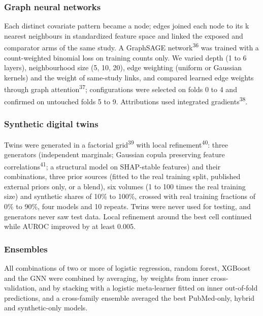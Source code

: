 \documentclass[
  11pt,
]{article}
\begin{document}
\subsubsection{Graph neural networks}\label{graph-neural-networks}

Each distinct covariate pattern became a node; edges joined each node to
its k nearest neighbours in standardized feature space and linked the
exposed and comparator arms of the same study. A GraphSAGE
network\textsuperscript{36} was trained with a count-weighted binomial
loss on training counts only. We varied depth (1 to 6 layers),
neighbourhood size (5, 10, 20), edge weighting (uniform or Gaussian
kernels) and the weight of same-study links, and compared learned edge
weights through graph attention\textsuperscript{37}; configurations were
selected on folds 0 to 4 and confirmed on untouched folds 5 to 9.
Attributions used integrated gradients\textsuperscript{38}.

\subsubsection{Synthetic digital twins}\label{synthetic-digital-twins}

Twins were generated in a factorial grid\textsuperscript{39} with local
refinement\textsuperscript{40}: three generators (independent marginals;
Gaussian copula preserving feature correlations\textsuperscript{41}; a
structural model on SHAP-stable features) and their combinations, three
prior sources (fitted to the real training split, published external
priors only, or a blend), six volumes (1 to 100 times the real training
size) and synthetic shares of 10\% to 100\%, crossed with real training
fractions of 0\% to 90\%, four models and 10 repeats. Twins were never
used for testing, and generators never saw test data. Local refinement
around the best cell continued while AUROC improved by at least 0.005.

\subsubsection{Ensembles}\label{ensembles}

All combinations of two or more of logistic regression, random forest,
XGBoost and the GNN were combined by averaging, by weights from inner
cross-validation, and by stacking with a logistic meta-learner fitted on
inner out-of-fold predictions, and a cross-family ensemble averaged the
best PubMed-only, hybrid and synthetic-only models.
\end{document}
